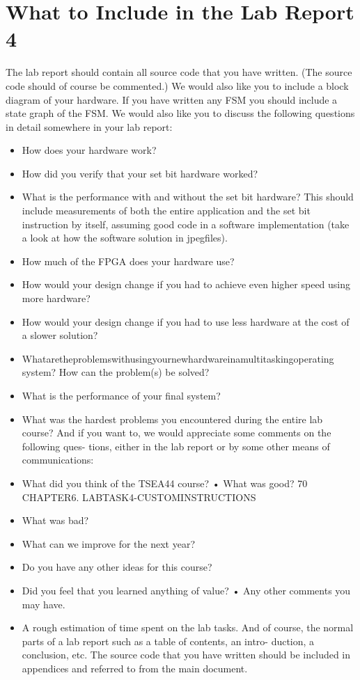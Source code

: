 \documentclass[a4paper]{article}
\begin{document}
\section{What to Include in the Lab Report 4}
The lab report should contain all source code that you have written. (The source code should of course be commented.) We would also like you to include a block diagram of your hardware. If you have written any FSM you should include a state graph of the FSM.
We would also like you to discuss the following questions in detail somewhere in your lab report:
\begin{itemize}
\item How does your hardware work?
\item How did you verify that your set bit hardware worked?
\item What is the performance with and without the set bit hardware? This should include measurements of both the entire application and the set bit instruction by itself, assuming good code in a software implementation (take a look at how the software solution in jpegfiles).
\item How much of the FPGA does your hardware use?
\item How would your design change if you had to achieve even higher speed using
more hardware?
\item How would your design change if you had to use less hardware at the cost of a slower solution?
\item Whataretheproblemswithusingyournewhardwareinamultitaskingoperating system? How can the problem(s) be solved?
\item What is the performance of your final system?
\item What was the hardest problems you encountered during the entire lab course?
And if you want to, we would appreciate some comments on the following ques- tions, either in the lab report or by some other means of communications:
\item What did you think of the TSEA44 course? • What was good?
70
CHAPTER6. LABTASK4-CUSTOMINSTRUCTIONS
\item What was bad?
\item What can we improve for the next year?
\item Do you have any other ideas for this course?
\item Did you feel that you learned anything of value? • Any other comments you may have.
\item A rough estimation of time spent on the lab tasks.
And of course, the normal parts of a lab report such as a table of contents, an intro- duction, a conclusion, etc. The source code that you have written should be included in appendices and referred to from the main document.
\end{itemize}
\end{document}
